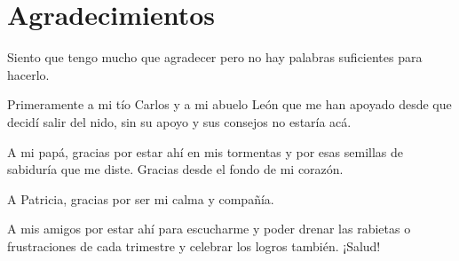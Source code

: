 \chapter*{Agradecimientos}

Siento que tengo mucho que agradecer pero no hay palabras suficientes para hacerlo.

Primeramente a mi tío Carlos y a mi abuelo León que me han apoyado desde que decidí salir del nido, sin su apoyo y sus consejos no estaría acá.

A mi papá, gracias por estar ahí en mis tormentas y por esas semillas de sabiduría que me diste. Gracias desde el fondo de mi corazón.

A Patricia, gracias por ser mi calma y compañía.

A mis amigos por estar ahí para escucharme y poder drenar las rabietas o frustraciones de cada trimestre y celebrar los logros también. ¡Salud!

\pagebreak